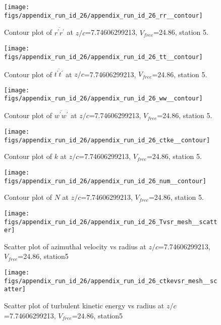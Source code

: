 \begin{figure}[H]
\centering
\texttt{[image: figs/appendix\_run\_id\_26/appendix\_run\_id\_26\_rr\_\_contour]}
\caption{Contour plot of $\overline{r^\prime r^\prime}$ at $z/c$=7.74606299213, $V_{free}$=24.86, station 5.}
\label{fig:appendix_run_id_26_rr__contour}
\end{figure}


\begin{figure}[H]
\centering
\texttt{[image: figs/appendix\_run\_id\_26/appendix\_run\_id\_26\_tt\_\_contour]}
\caption{Contour plot of $\overline{t^\prime t^\prime}$ at $z/c$=7.74606299213, $V_{free}$=24.86, station 5.}
\label{fig:appendix_run_id_26_tt__contour}
\end{figure}


\begin{figure}[H]
\centering
\texttt{[image: figs/appendix\_run\_id\_26/appendix\_run\_id\_26\_ww\_\_contour]}
\caption{Contour plot of $\overline{w^\prime w^\prime}$ at $z/c$=7.74606299213, $V_{free}$=24.86, station 5.}
\label{fig:appendix_run_id_26_ww__contour}
\end{figure}


\begin{figure}[H]
\centering
\texttt{[image: figs/appendix\_run\_id\_26/appendix\_run\_id\_26\_ctke\_\_contour]}
\caption{Contour plot of $k$ at $z/c$=7.74606299213, $V_{free}$=24.86, station 5.}
\label{fig:appendix_run_id_26_ctke__contour}
\end{figure}


\begin{figure}[H]
\centering
\texttt{[image: figs/appendix\_run\_id\_26/appendix\_run\_id\_26\_num\_\_contour]}
\caption{Contour plot of $N$ at $z/c$=7.74606299213, $V_{free}$=24.86, station 5.}
\label{fig:appendix_run_id_26_num__contour}
\end{figure}


\begin{figure}[H]
\centering
\texttt{[image: figs/appendix\_run\_id\_26/appendix\_run\_id\_26\_Tvsr\_mesh\_\_scatter]}
\caption{Scatter plot of azimuthal velocity vs radius at $z/c$=7.74606299213, $V_{free}$=24.86, station5}
\label{fig:appendix_run_id_26_Tvsr_mesh__scatter}
\end{figure}


\begin{figure}[H]
\centering
\texttt{[image: figs/appendix\_run\_id\_26/appendix\_run\_id\_26\_ctkevsr\_mesh\_\_scatter]}
\caption{Scatter plot of turbulent kinetic energy vs radius at $z/c$=7.74606299213, $V_{free}$=24.86, station5}
\label{fig:appendix_run_id_26_ctkevsr_mesh__scatter}
\end{figure}


